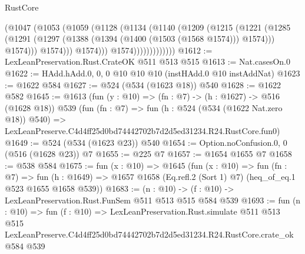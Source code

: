 \begin{lexlean}{RustCore}
\begin{coremodule}
                          (@1047
                            (@1053
                              (@1059
                                (@1128
                                  (@1134
                                    (@1140
                                      (@1209
                                        (@1215
                                          (@1221
                                            (@1285
                                              (@1291
                                                (@1297
                                                  (@1388
                                                    (@1394 (@1400 (@1503 (@1568 @1574))) @1574)))
                                                @1574)))
                                          @1574)))
                                    @1574)))
                              @1574)))))))))))))
@1612 := LexLeanPreservation.Rust.CrateOK @511 @513 @515
@1613 := Nat.casesOn.{0}
@1622 := HAdd.hAdd.{0, 0, 0} @10 @10 @10 (instHAdd.{0} @10 instAddNat)
@1623 := @1622 @584
@1627 := @524 (@534 (@1623 @18)) @540
@1628 := @1622 @582
@1645 := @1613
    (fun (y : @10) => (fn : @7) -> (h : @1627) -> @516 (@1628 @18))
    @539
    (fun (fn : @7) =>
    fun (h : @524 (@534 (@1622 Nat.zero @18)) @540) =>
    LexLeanPreserve.C4d4ff25d0bd74442702b7d2d5ed31234.R24.RustCore.fun0)
@1649 := @524 (@534 (@1623 @23)) @540
@1654 := Option.noConfusion.{0, 0} (@516 (@1628 @23)) @7
@1655 := @225 @7
@1657 := @1654 @1655 @7
@1658 := @538 @584
@1675 := fun (x : @10) =>
  @1645
    (fun (x : @10) =>
    fun (fn : @7) =>
    fun (h : @1649) => @1657 @1658 (Eq.refl.{2} (Sort 1) @7) (heq_of_eq.{1} @523 @1655 @1658 @539))
@1683 := (n : @10) -> (f : @10) -> LexLeanPreservation.Rust.FunSem @511 @513 @515 @584 @539
@1693 := fun (n : @10) =>
  fun (f : @10) =>
  LexLeanPreservation.Rust.simulate
    @511
    @513
    @515
    LexLeanPreserve.C4d4ff25d0bd74442702b7d2d5ed31234.R24.RustCore.crate_ok
    @584
    @539
\end{coremodule}
\end{lexlean}
